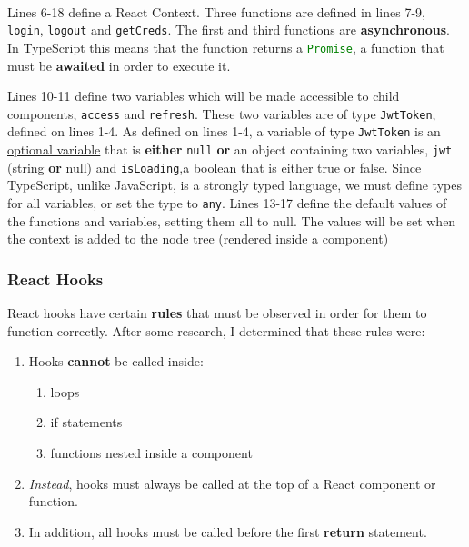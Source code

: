 \documentclass[../../main.tex]{subfiles}
\begin{document}
\noindent \\ Lines 6-18 define a React Context. Three functions are
defined in lines 7-9, \lstinline{login}, \lstinline{logout} and
\lstinline{getCreds}.
The first and third functions are \textbf{asynchronous}.
In TypeScript this means that the function returns a
\lstinline[language=typescript]{Promise}, a function that must be
\textbf{awaited} in order to execute it.

\noindent Lines 10-11 define two variables which will be made accessible to
child components, \lstinline{access} and \lstinline{refresh}.
These two variables are of type \lstinline{JwtToken}, defined on
lines 1-4. As defined on lines 1-4, a variable of type
\lstinline{JwtToken} is an \underline{optional variable} that is
\textbf{either} \lstinline{null} \textbf{or} an object containing
two variables, \lstinline{jwt} (string \textbf{or} null) and
\lstinline{isLoading},a boolean that is either true or false.
Since TypeScript, unlike JavaScript, is a strongly
typed language, we must define types for all variables, or set
the type to \lstinline{any}.
Lines 13-17 define the default values of the functions and variables,
setting them all to null. The values will be set when the context
is added to the node tree (rendered inside a component)

\subsubsection{React Hooks}

React hooks have certain \textbf{rules} that must be observed
in order for them to function correctly. After some research,
I determined that these rules were:

\begin{enumerate}
  \item Hooks \textbf{cannot} be called inside:
        \begin{enumerate}
          \item loops
          \item if statements
          \item functions nested inside a component
        \end{enumerate}
  \item \textit{Instead}, hooks must always be called at the top of a React
        component or function.
  \item In addition, all hooks must be called before the first
        \textbf{return} statement.
\end{enumerate}
\end{document}
